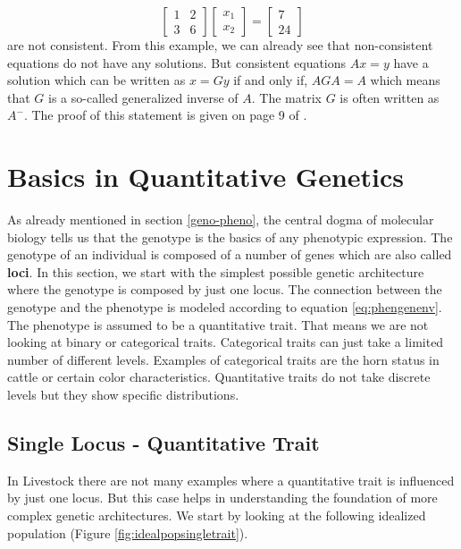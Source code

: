 \documentclass[
]{book}
\theoremstyle{definition}
\theoremstyle{definition}
\theoremstyle{definition}
\theoremstyle{remark}
\begin{document}
\[
\left[
\begin{array}{cc}
1  &  2  \\
3  &  6
\end{array}\right]
\left[
\begin{array}{c}
x_1  \\
x_2
\end{array}\right]
=
\left[
\begin{array}{c}
7  \\
24
\end{array}\right]
\]
are not consistent. From this example, we can already see that non-consistent equations do not have any solutions. But consistent equations \(Ax = y\) have a solution which can be written as \(x = Gy\) if and only if, \(AGA = A\) which means that \(G\) is a so-called generalized inverse of \(A\). The matrix \(G\) is often written as \(A^-\). The proof of this statement is given on page 9 of \citep{Searle1971}.

\hypertarget{quan-gen}{%
\chapter{Basics in Quantitative Genetics}\label{quan-gen}}

As already mentioned in section \ref{geno-pheno}, the central dogma of molecular biology tells us that the genotype is the basics of any phenotypic expression. The genotype of an individual is composed of a number of genes which are also called \textbf{loci}. In this section, we start with the simplest possible genetic architecture where the genotype is composed by just one locus. The connection between the genotype and the phenotype is modeled according to equation \eqref{eq:phengenenv}. The phenotype is assumed to be a quantitative trait. That means we are not looking at binary or categorical traits. Categorical traits can just take a limited number of different levels. Examples of categorical traits are the horn status in cattle or certain color characteristics. Quantitative traits do not take discrete levels but they show specific distributions.

\hypertarget{single-locus-quant-trait}{%
\section{Single Locus - Quantitative Trait}\label{single-locus-quant-trait}}

In Livestock there are not many examples where a quantitative trait is influenced by just one locus. But this case helps in understanding the foundation of more complex genetic architectures. We start by looking at the following idealized population (Figure \ref{fig:idealpopsingletrait}).
\end{document}
